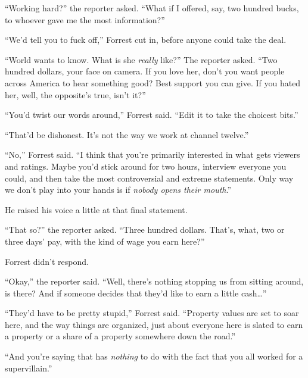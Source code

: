 ``Working hard?'' the reporter asked.  ``What if I offered, say, two hundred bucks, to whoever gave me the most information?''



``We'd tell you to fuck off,'' Forrest cut in, before anyone could take the deal.



``World wants to know.  What is she \emph{really} like?''  The reporter asked.  ``Two hundred dollars, your face on camera.  If you love her, don't you want people across America to hear something good?  Best support you can give.  If you hated her, well, the opposite's true, isn't it?''



``You'd twist our words around,'' Forrest said.  ``Edit it to take the choicest bits.''



``That'd be dishonest.  It's not the way we work at channel twelve.''



``No,'' Forrest said.  ``I think that you're primarily interested in what gets viewers and ratings.  Maybe you'd stick around for two hours, interview everyone you could, and then take the most controversial and extreme statements.  Only way we don't play into your hands is if \emph{nobody opens their mouth}.''



He raised his voice a little at that final statement.



``That so?'' the reporter asked.  ``Three hundred dollars.  That's, what, two or three days' pay, with the kind of wage you earn here?''



Forrest didn't respond.



``Okay,'' the reporter said.  ``Well, there's nothing stopping us from sitting around, is there?  And if someone decides that they'd like to earn a little cash\ldots''



``They'd have to be pretty stupid,'' Forrest said.  ``Property values are set to soar here, and the way things are organized, just about everyone here is slated to earn a property or a share of a property somewhere down the road.''



``And you're saying that has \emph{nothing} to do with the fact that you all worked for a supervillain.''




